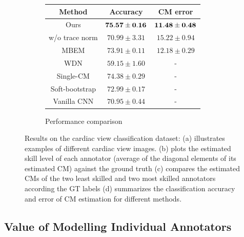 \begin{figure}[h]
	\begin{subfigure}[]{0.55\linewidth}
		\vspace{3mm}
	    \caption{Performance comparison}
	    \begin{tabular}{|c|c c|} 
             \hline
             Method & Accuracy & CM error \\ 
             \hline
             Ours & $\bf{75.57\pm 0.16}$ &  $\bf{11.48 \pm 0.48}$ \\ 
             w/o trace norm & $70.99 \pm 3.31$ & $15.22 \pm0.94$  \\ 
             MBEM \cite{khetan2017learning} & $73.91\pm 0.11$ & $12.18\pm0.29$ \\ 
             WDN \cite{guan2017said} & $59.15 \pm 1.60$ & - \\ 
             Single-CM \cite{sukhbaatar2014training} & $74.38\pm0.29$ & - \\ 
             Soft-bootstrap \cite{reed2014training} & $72.99\pm 0.17$ & - \\ 
             Vanilla CNN & $70.95\pm 0.44$ & -\\ 
             \hline
        \end{tabular}
        
	\end{subfigure}
	\caption{\small Results on the cardiac view classification dataset: (a) illustrates examples of different cardiac view images. (b) plots the estimated skill level of each annotator (average of the diagonal elements of its estimated CM)  against the ground truth (c) compares the estimated CMs of the two least skilled and two most skilled annotators according the GT labels (d) summarizes the classification accuracy and error of CM estimation for different methods. }
	\label{fig:us_experiments}
\end{figure}


\subsection{Value of Modelling Individual Annotators}

